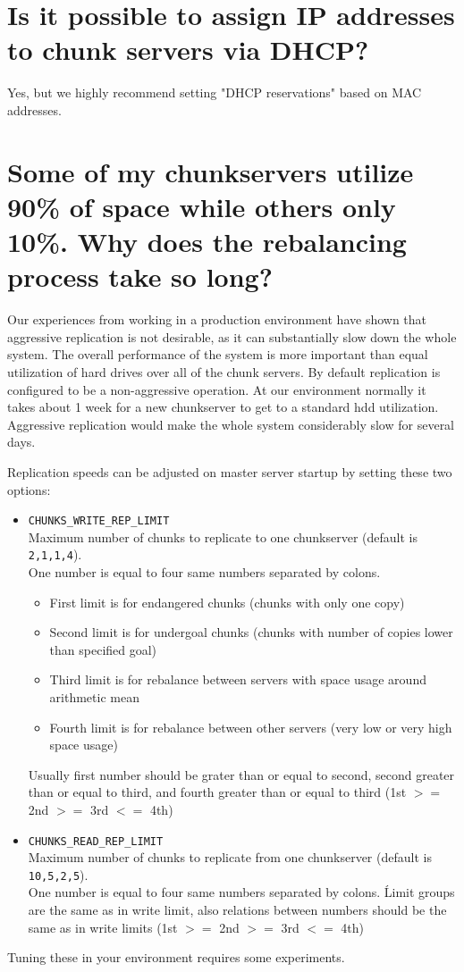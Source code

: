 \documentclass[a4paper,11pt,english]{report}
\def\code#1{\texttt{#1}}
\begin{document}
		
		\section{Is it possible to assign IP addresses to chunk servers via DHCP?}
		Yes, but we highly recommend setting "DHCP reservations" based on MAC addresses.
		 
		 
		\section{Some of my chunkservers utilize 90\% of space while others only 10\%. Why does the rebalancing process take so long?}
		Our experiences from working in a production environment have shown that aggressive replication is not desirable, as it can substantially slow down the whole system. The overall performance of the system is more important than equal utilization of hard drives over all of the chunk servers. By default replication is configured to be a non-aggressive operation. At our environment normally it takes about 1 week for a new chunkserver to get to a standard hdd utilization. Aggressive replication would make the whole system considerably slow for several days.
		


		Replication speeds can be adjusted on master server startup by setting these two options:
		\begin{itemize}
		
			\item \code{CHUNKS\_WRITE\_REP\_LIMIT} \\
			Maximum number of chunks to replicate to one chunkserver (default is \code{2,1,1,4}). \\
			One number is equal to four same numbers separated by colons.
			\begin{itemize}
				\item First limit is for endangered chunks (chunks with only one copy)
				\item Second limit is for undergoal chunks (chunks with number of copies lower than specified goal)
				\item Third limit is for rebalance between servers with space usage around arithmetic mean
				\item Fourth limit is for rebalance between other servers (very low or very high space usage)
			\end{itemize}
			Usually first number should be grater than or equal to second, second greater than or equal to third, and fourth greater than or equal to third (1st $>=$ 2nd $>=$ 3rd $<=$ 4th)
			
			\item \code{CHUNKS\_READ\_REP\_LIMIT} \\
			Maximum number of chunks to replicate from one chunkserver (default is \code{10,5,2,5}). \\
			One number is equal to four same numbers separated by colons. \'
			Limit groups are the same as in write limit, also relations between numbers should be the same as in write limits (1st $>=$ 2nd $>=$ 3rd $<=$ 4th)
			
		\end{itemize}
		Tuning these in your environment requires some experiments.
		 
\end{document}

